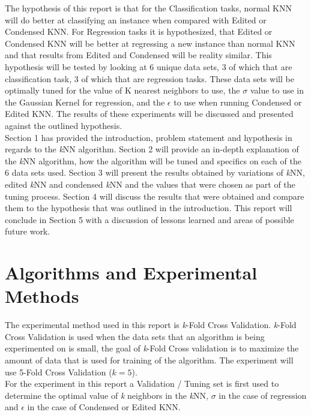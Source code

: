\documentclass[twoside,11pt]{article}
\begin{document}
\hspace*{10mm} The hypothesis of this report is that for the Classification tasks, normal KNN will do better at classifying an instance when compared with Edited or Condensed KNN. For Regression tasks it is hypothesized, that Edited or Condensed KNN will be better at regressing a new instance than normal KNN and that results from Edited and Condensed will be reality similar. This hypothesis will be tested by looking at 6 unique data sets, 3 of which that are classification task, 3 of which that are regression tasks. These data sets will be optimally tuned for the value of K nearest neighbors to use, the $\sigma$ value to use in the Gaussian Kernel for regression, and the $\epsilon$ to use when running Condensed or Edited KNN. The results of these experiments will be discussed and presented against the outlined hypothesis. \\

\hspace*{10mm} Section 1 has provided the introduction, problem statement and hypothesis in regards to the \textit{k}NN algorithm. Section 2 will provide an in-depth explanation of the \textit{k}NN algorithm, how the algorithm will be tuned and specifics on each of the 6 data sets used. Section 3 will present the results obtained by variations of \textit{k}NN, edited \textit{k}NN and condensed \textit{k}NN and the values that were chosen as part of the tuning process. Section 4 will discuss the results that were obtained and compare them to the hypothesis that was outlined in the introduction. This report will conclude in Section 5 with a discussion of lessons learned and areas of possible future work.\newline



\section{Algorithms and Experimental Methods}
The experimental method used in this report is \textit{k}-Fold Cross Validation. \textit{k}-Fold Cross Validation is used when the data sets that an algorithm is being experimented on is small, the goal of \textit{k}-Fold Cross validation is to maximize the amount of data that is used for training of the algorithm. The experiment will use 5-Fold Cross Validation ($\textit{k} = 5$).\\ 
For the experiment in this report a Validation / Tuning set is first used to determine the optimal value of \textit{k} neighbors in the \textit{k}NN, $\sigma$ in the case of regression and $\epsilon$ in the case of Condensed or Edited KNN. \\ 
\end{document}
